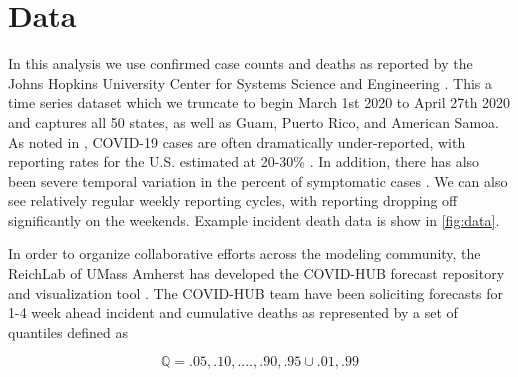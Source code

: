\documentclass[11pt]{amsart}
\begin{document}
\section{Data}
	In this analysis we use confirmed case counts and deaths as reported by the Johns Hopkins University Center for Systems Science and Engineering \cite{dong2020interactive}. This a time series dataset which we truncate to begin March 1st 2020 to April 27th 2020 and captures all 50 states, as well as Guam, Puerto Rico, and American Samoa. As noted in \cite{krantz2020level}, COVID-19 cases are often dramatically under-reported, with reporting rates for the U.S. estimated at 20-30\% \cite{russel2020using}. In addition, there has also been severe temporal variation in the percent of symptomatic cases  \cite{russel2020using}. We can also see relatively regular weekly reporting cycles, with reporting dropping off significantly on the weekends. Example incident death data is show in \ref{fig:data}.
	
In order to organize collaborative efforts across the modeling community, the ReichLab of UMass Amherst has developed the COVID-HUB forecast repository and visualization tool \cite{covid-hub}. The COVID-HUB team have been soliciting forecasts for 1-4 week ahead incident and cumulative deaths as represented by a set of quantiles defined as 

\begin{equation}
\mathbb{Q} = {.05,.10,....,.90,.95} \cup {.01,.99}
\end{equation}
\end{document}
